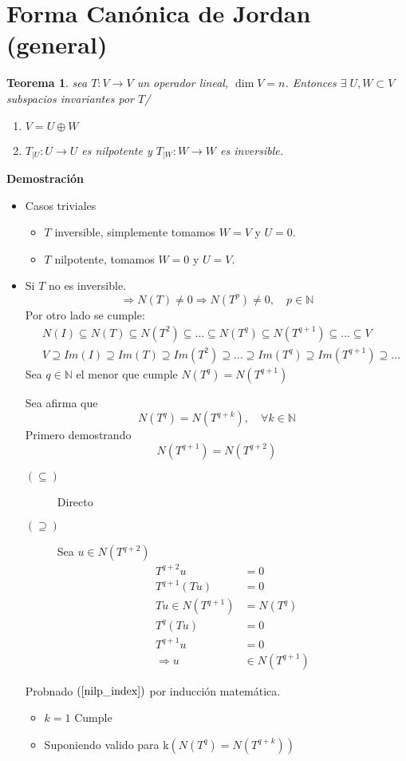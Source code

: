 \documentclass[10pt,a4paper]{article}
\newtheorem{mytheo}{Teorema}
\begin{document}
\section{Forma Canónica de Jordan (general)}
\begin{mytheo}
	sea $T:V\rightarrow V$ un operador lineal, $\dim V = n$. Entonces $\exists\;U, W\subset V$ subspacios invariantes por $T$/
	\begin{enumerate}
		\item $V = U\oplus W$
		\item $T_{|U}:U\rightarrow U$ es nilpotente y $T_{|W}:W\rightarrow W$ es inversible.
	\end{enumerate}
\end{mytheo}
\textbf{Demostración}\\
\begin{itemize}
	\item Casos triviales
			\begin{itemize}
				\item $T$ inversible, simplemente tomamos $W = V$ y $U=0$.
				\item $T$ nilpotente, tomamos $W = 0$ y $U = V$.
			\end{itemize}
	\item Si $T$ no es inversible.
		$$\Rightarrow N(T) \neq 0 \Rightarrow N(T^{p}) \neq 0,\quad p\in\mathbb{N}$$
		Por otro lado se cumple:
		\begin{align*}
		& N(I)\subseteq N(T)\subseteq N(T^{2})\subseteq \ldots\subseteq N(T^{q})\subseteq N(T^{q+1}) \subseteq\ldots\subseteq V\\
		& V \supseteq Im(I)\supseteq Im(T)\supseteq Im(T^{2})\supseteq\ldots\supseteq Im(T^{q})\supseteq Im(T^{q+1})\supseteq\ldots
		\end{align*}
		Sea $q\in\mathbb{N}$ el menor que cumple $N(T^{q}) = N(T^{q+1})$
		
		Sea afirma que 
		\begin{equation}\label{nilp_index}
		N(T^{q}) =  N(T^{q+k}),\quad\forall k\in\mathbb{N}
		\end{equation}
		Primero demostrando
		$$N(T^{q+1}) = N(T^{q+2})$$
		\begin{description}
			\item[$(\subseteq)$] Directo
			\item[$(\supseteq)$] Sea $u\in N(T^{q+2})$
			\begin{align*}
				T^{q+2}u &= 0\\
				T^{q+1}(Tu) &= 0\\
				Tu\in N(T^{q+1}) &= N(T^{q})\\
				T^{q}(Tu) &= 0\\
				T^{q+1}u &= 0\\
				\Rightarrow u &\in N(T^{q+1})
			\end{align*}
		\end{description}
		Probnado $(\ref{nilp_index})$ por inducción matemática.
		\begin{itemize}
			\item $k = 1$ Cumple
			\item Suponiendo valido para k$\left(N\left(T^{q}\right) = N\left(T^{q+k}\right) \right)$
			

\end{itemize}
\end{itemize}
\end{document}
